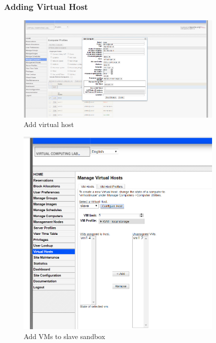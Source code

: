 \documentclass[12pt]{extarticle}
\begin{document}
\subsubsection{Adding Virtual Host}
\begin{figure}[H]
\centering
\includegraphics[width=0.9\textwidth]{add_computer}
\caption{Add virtual host}
\label{fig:vclvirtualhost}
\end{figure}

\begin{figure}[H]
\centering
\includegraphics[width=0.9\textwidth]{add_virtualhost}
\caption{Add VMs to slave sandbox}
\label{fig:vclvm}
\end{figure}
\end{document}
